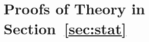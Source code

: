 \documentclass[twoside,11pt]{article}
\theoremstyle{definition}
\newtheorem{example}{Example}
\def\sign{\textup{sgn}}
\def\srank{\textup{srank}}
\def\rank{\textup{rank}}
\begin{document}






\section{Proofs of Theory in Section~\ref{sec:stat}}\label{sec:proofs}
\end{document}
